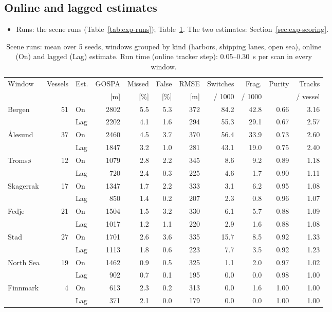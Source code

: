 \subsection{Online and lagged estimates}
\label{sec:res-estimates}

\begin{itemize}
    \item Runs: the scene runs (Table~\ref{tab:exp-runs}); Table~\ref{tab:res-scenes}. The two estimates: Section~\ref{sec:exp-scoring}.
\end{itemize}

\begin{table}[htbp]
\centering
\caption{Scene runs: mean over 5 seeds, windows grouped by kind (harbors, shipping lanes, open sea), online (On) and lagged (Lag) estimate. Run time (online tracker step): 0.05--0.30~s per scan in every window.}
\label{tab:res-scenes}
\small
\setlength{\tabcolsep}{4.5pt}
\begin{tabular}{l r l r r r r r r r r}
\toprule
Window & Vessels & Est. & GOSPA & Missed & False & RMSE & Switches & Frag. & Purity & Tracks \\
 & & & [m] & [\%] & [\%] & [m] & / 1000 & / 1000 & & / vessel \\
\midrule
Bergen & 51 & On & 2802 & 5.5 & 5.3 & 372 & 84.2 & 42.8 & 0.66 & 3.16 \\
 & & Lag & 2202 & 4.1 & 1.6 & 294 & 55.3 & 29.1 & 0.67 & 2.57 \\
\addlinespace
Ålesund & 37 & On & 2460 & 4.5 & 3.7 & 370 & 56.4 & 33.9 & 0.73 & 2.60 \\
 & & Lag & 1847 & 3.2 & 1.0 & 281 & 43.1 & 19.0 & 0.75 & 2.40 \\
\addlinespace
Tromsø & 12 & On & 1079 & 2.8 & 2.2 & 345 & 8.6 & 9.2 & 0.89 & 1.18 \\
 & & Lag & 720 & 2.4 & 0.3 & 225 & 4.6 & 1.7 & 0.90 & 1.11 \\
\addlinespace
Skagerrak & 17 & On & 1347 & 1.7 & 2.2 & 333 & 3.1 & 6.2 & 0.95 & 1.08 \\
 & & Lag & 850 & 1.4 & 0.2 & 207 & 2.3 & 0.8 & 0.96 & 1.07 \\
\addlinespace 
Fedje & 21 & On & 1504 & 1.5 & 3.2 & 330 & 6.1 & 5.7 & 0.88 & 1.09 \\
 & & Lag & 1017 & 1.2 & 1.1 & 220 & 2.9 & 1.6 & 0.88 & 1.08 \\
\addlinespace 
Stad & 27 & On & 1701 & 2.6 & 3.6 & 335 & 15.7 & 8.5 & 0.92 & 1.33 \\
 & & Lag & 1113 & 1.8 & 0.6 & 223 & 7.7 & 3.5 & 0.92 & 1.23 \\
\addlinespace
North Sea & 19 & On & 1462 & 0.9 & 0.5 & 325 & 1.1 & 2.0 & 0.97 & 1.02 \\
 & & Lag & 902 & 0.7 & 0.1 & 195 & 0.0 & 0.0 & 0.98 & 1.00 \\
\addlinespace 
Finnmark & 4 & On & 613 & 2.3 & 0.2 & 313 & 0.0 & 1.6 & 1.00 & 1.00 \\
 & & Lag & 371 & 2.1 & 0.0 & 179 & 0.0 & 0.0 & 1.00 & 1.00 \\
\bottomrule
\end{tabular}
\end{table}

